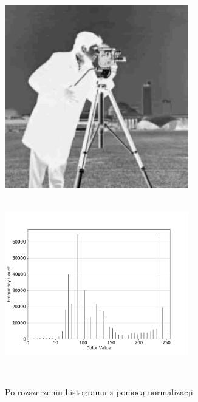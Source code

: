 \documentclass[a4paper,12pt]{book}
\begin{document}
\begin{figure}[H]
	\caption{Po rozszerzeniu histogramu z pomocą normalizacji}
	\includegraphics[width=8cm, height=8cm]{5-3/extend-histogram-image-photoman-bright.png}
	\includegraphics[width=8cm, height=8cm]{5-3/extend-histogram-photoman-bright.png}
\end{figure}
\end{document}
